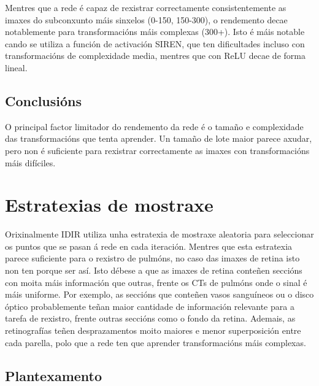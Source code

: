 Mentres que a rede é capaz de rexistrar correctamente consistentemente as imaxes do subconxunto máis sinxelos (0-150, 150-300), o rendemento decae notablemente para transformacións máis complexas (300+). 
Isto é máis notable cando se utiliza a función de activación SIREN, que ten dificultades incluso con transformacións de complexidade media, mentres que con ReLU decae de forma lineal.

\subsection{Conclusións}
\label{subsec:Conclusions-batchsize}

O principal factor limitador do rendemento da rede é o tamaño e complexidade das transformacións que tenta aprender.
Un tamaño de lote maior parece axudar, pero non é suficiente para rexistrar correctamente as imaxes con transformacións máis difíciles.

\section{Estratexias de mostraxe}
\label{sec:Estratexias de mostraxe}

Orixinalmente IDIR utiliza unha estratexia de mostraxe aleatoria para seleccionar os puntos que se pasan á rede en cada iteración.
Mentres que esta estratexia parece suficiente para o rexistro de pulmóns, no caso das imaxes de retina isto non ten porque ser así.
Isto débese a que as imaxes de retina conteñen seccións con moita máis información que outras, frente os CTs de pulmóns onde o sinal é máis uniforme.
Por exemplo, as seccións que conteñen vasos sanguíneos ou o disco óptico probablemente teñan maior cantidade de información relevante para a tarefa de rexistro, frente outras seccións como o fondo da retina.
Ademais, as retinografías teñen desprazamentos moito maiores e menor superposición entre cada parella, polo que a rede ten que aprender transformacións máis complexas.

\subsection{Plantexamento}
\label{subsec:Plantexamento-sampling}

